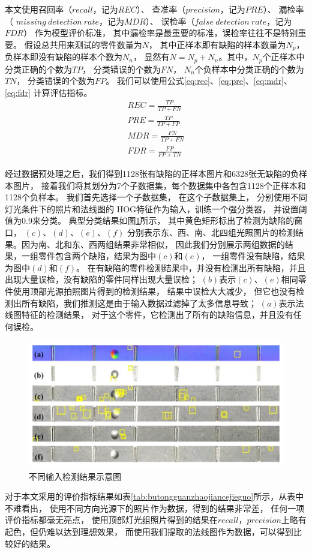 本文使用召回率（$recall$，记为$REC$）、
查准率（$precision$，记为$PRE$）、
漏检率（ $missing~detection~rate$，记为$MDR$）、
误检率（$false~detection~rate$，记为$FDR$）
作为模型评价标准，
其中漏检率是最重要的标准，误检率往往不是特别重要。
假设总共用来测试的零件数量为$N$，
其中正样本即有缺陷的样本数量为$N_p$，
负样本即没有缺陷的样本个数为$N_n$，
显然有$N=N_p+N_n$。其中，$N_p$个正样本中分类正确的个数为$TP$，
分类错误的个数为$FN$，
$N_n$个负样本中分类正确的个数为$TN$，
分类错误的个数为$FP$。
我们可以使用公式\eqref{eq:rec}、\eqref{eq:pre}、\eqref{eq:mdr}、\eqref{eq:fdr}
计算评估指标。
\begin{gather}
REC=\frac{TP}{TP+FN}\label{eq:rec}\\
PRE=\frac{TP}{TP+FP}\label{eq:pre}\\
MDR=\frac{FN}{TP+FN}\label{eq:mdr}\\
FDR=\frac{FP}{FP+TN}\label{eq:fdr}
\end{gather}

经过数据预处理之后，我们得到1128张有缺陷的正样本图片和6328张无缺陷的负样本图片，
接着我们将其划分为7个子数据集，每个数据集中各包含1128个正样本和1128个负样本。
我们首先选择一个子数据集，
在这个子数据集上，
分别使用不同灯光条件下的照片和法线图的
HOG特征作为输入，训练一个强分类器，
并设置阈值为0.9来分类。
典型分类结果如图\ref{fig:chuantongjiancejieguo}所示，
其中黄色矩形标出了检测为缺陷的窗口，
$(c)$、$(d)$、$(e)$、$(f)$
分别表示东、西、南、北四组光照图片的检测结果。因为南、北和东、西两组结果非常相似，
因此我们分别展示两组数据的结果，一组零件包含两个缺陷，结果为图中$(c)$和$(e)$，
一组零件没有缺陷，结果为图中$(d)$和$(f)$。
在有缺陷的零件检测结果中，并没有检测出所有缺陷，并且出现大量误检，没有缺陷的零件同样出现大量误检；
$(b)$表示$(c)$、$(e)$相同零件使用顶部光源拍照图片得到的检测结果，
结果中误检大大减少，
但它也没有检测出所有缺陷，我们推测这是由于输入数据过滤掉了太多信息导致；
$(a)$表示法线图特征的检测结果，
对于这个零件，它检测出了所有的缺陷信息，并且没有任何误检。
\begin{figure}[htbp]
\centering
\includegraphics[width=1.0\linewidth]{figures/chuantongjiancejieguo.png}
\caption{不同输入检测结果示意图}
\label{fig:chuantongjiancejieguo}
\end{figure}
对于本文采用的评价指标结果如表\ref{tab:butongguanzhaojiancejieguo}所示，从表中不难看出，
使用不同方向光源下的照片作为数据，得到的结果非常差，
任何一项评价指标都毫无亮点，
使用顶部灯光组照片得到的结果在$recall$，$precision$上略有起色，但仍难以达到理想效果，
而使用我们提取的法线图作为数据，可以得到比较好的结果。

